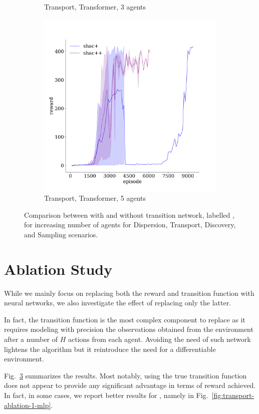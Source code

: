 \begin{figure}[!t]
\begin{subfigure}[b]{0.32\textwidth}
        \caption{Transport, Transformer, 3 agents}
        \label{fig:transport-ablation-transformer-3}
    \end{subfigure}
    \begin{subfigure}[b]{0.32\textwidth}
        \includegraphics[width=\textwidth]{figs/transport-ablation-5-transformer.pdf}
        \caption{Transport, Transformer, 5 agents}
        \label{fig:transport-ablation-transformer-5}
    \end{subfigure}

    \caption{Comparison between \fname{} with and without transition network, labelled \fnamer{}, for increasing number of agents for Dispersion, Transport, Discovery, and Sampling scenarios.}
    \label{fig:ablation}
\end{figure}




\section{Ablation Study}\label{sect:ablation}
While we mainly focus on replacing both the reward and transition function with neural networks, we also investigate the effect of replacing only the latter. 

In fact, the transition function is the most complex component to replace as it requires modeling with precision the observations obtained from the environment after a number of $H$ actions from each agent. Avoiding the need of such network lightens the algorithm but it reintroduce the need for a differentiable environment.

Fig.~\ref{fig:ablation} summarizes the results. Most notably, using the true transition function does not appear to provide any significant advantage in terms of reward achieved. In fact, in some cases, we report better results for \fname{}, namely in Fig.~\ref{fig:transport-ablation-1-mlp}. 
